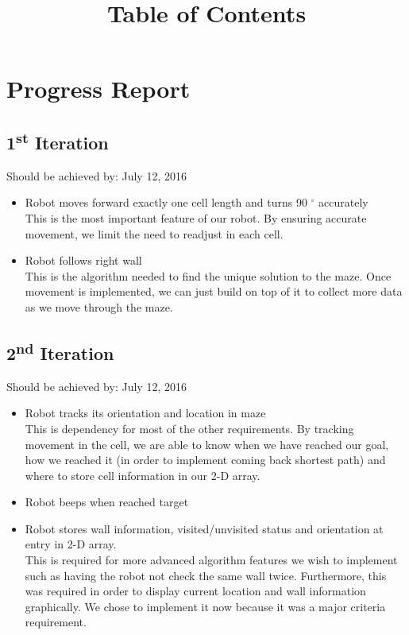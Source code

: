 \documentclass[11pt]{article}
\date{}
\title{Table of Contents}
\newcommand{\ts}{\textsuperscript}
\begin{document}
\maketitle

\tableofcontents

\newpage




\section{Progress Report}
\subsection{1\ts{st} Iteration}
Should be achieved by: July 12, 2016
\begin{itemize}
\item Robot moves forward exactly one cell length and turns 90 $^{\circ}$ accurately\\
This is the most important feature of our robot. By ensuring accurate movement, we limit the need to readjust in each cell.
\item Robot follows right wall\\
This is the algorithm needed to find the unique solution to the maze. Once movement is implemented, we can just build on top of it to collect more data as we move through the maze. 
\end{itemize}

\subsection{2\ts{nd} Iteration}
Should be achieved by: July 12, 2016
\begin{itemize}
\item Robot tracks its orientation and location in maze\\
This is dependency for most of the other requirements. By tracking movement in the cell, we are able to know when we have reached our goal, how we reached it (in order to implement coming back shortest path) and where to store cell information in our 2-D array.
\item Robot beeps when reached target
\item Robot stores wall information, visited/unvisited status and orientation at entry in 2-D array.\\
This is required for more advanced algorithm features we wish to implement such as having the robot not check the same wall twice. Furthermore, this was required in order to display current location and wall information graphically. We chose to implement it now because it was a major criteria requirement. 
\end{itemize}
\end{document}
